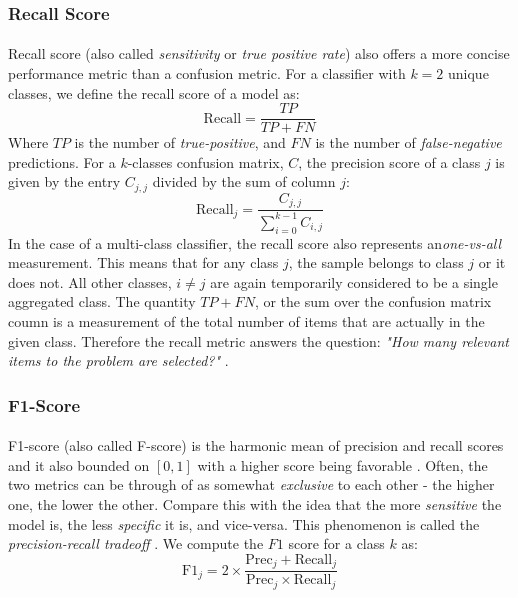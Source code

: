 \documentclass[12pt,letterpaper]{article}
\begin{document}

\subsubsection{Recall Score}

\paragraph*{}Recall score (also called \textit{sensitivity} or \textit{true positive rate}) also offers a more concise performance metric than a confusion metric. For a classifier with $k = 2$ unique classes, we define the recall score of a model as:
\begin{equation}
\label{eqn-BinaryRecall}
\text{Recall} = \frac{TP}{TP + FN}
\end{equation}
Where $TP$ is the number of \textit{true-positive}, and $FN$ is the number of \textit{false-negative} predictions. For a $k$-classes confusion matrix, $C$, the precision score of a class $j$ is given by the entry $C_{j,j}$ divided by the sum of column $j$:
\begin{equation}
\label{eqn-KRecall}
\text{Recall}_j = \frac{C_{j,j}}{\sum_{i=0}^{k-1}C_{i,j}}
\end{equation}
In the case of a multi-class classifier, the recall score also represents an\textit{one-vs-all} measurement. This means that for any class $j$, the sample belongs to class $j$ or it does not. All other classes, $i \neq j$ are again temporarily considered to be a single aggregated class. The quantity $TP + FN$, or the sum over the confusion matrix coumn is a measurement of the total number of items that are actually in the given class. Therefore the recall metric answers the question: \textit{"How many relevant items to the problem are selected?"} \cite{Geron,James}.


\subsubsection{F1-Score}

\paragraph*{}F1-score (also called F-score) is the harmonic mean of precision and recall scores and it also bounded on $[0,1]$ with a higher score being favorable \cite{Geron}. Often, the two metrics can be through of as somewhat \textit{exclusive} to each other - the higher one, the lower the other. Compare this with the idea that the more \textit{sensitive} the model is, the less \textit{specific} it is, and vice-versa. This phenomenon is called the \textit{precision-recall tradeoff} \cite{Geron,James}. We compute the $F1$ score for a class $k$ as:
\begin{equation}
\label{eqn-F1Score}
\text{F1}_{j} = 2 \times \frac{\text{Prec}_j + \text{Recall}_j}{\text{Prec}_j \times \text{Recall}_j}
\end{equation}
\end{document}
